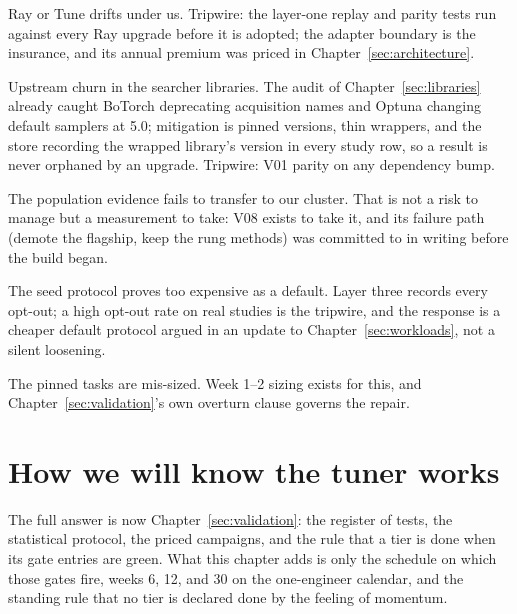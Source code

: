 Ray or Tune drifts under us. Tripwire: the layer-one replay and
parity tests run against every Ray upgrade before it is adopted;
the adapter boundary is the insurance, and its annual premium was
priced in Chapter~\ref{sec:architecture}.

Upstream churn in the searcher libraries. The audit of
Chapter~\ref{sec:libraries} already caught BoTorch deprecating
acquisition names and Optuna changing default samplers at 5.0;
mitigation is pinned versions, thin wrappers, and the store
recording the wrapped library's version in every study row, so a
result is never orphaned by an upgrade. Tripwire: V01 parity on any
dependency bump.

The population evidence fails to transfer to our cluster. That is
not a risk to manage but a measurement to take: V08 exists to take
it, and its failure path (demote the flagship, keep the rung
methods) was committed to in writing before the build began.

The seed protocol proves too expensive as a default. Layer three
records every opt-out; a high opt-out rate on real studies is the
tripwire, and the response is a cheaper default protocol argued in
an update to Chapter~\ref{sec:workloads}, not a silent loosening.

The pinned tasks are mis-sized. Week 1--2 sizing exists for this,
and Chapter~\ref{sec:validation}'s own overturn clause governs the
repair.

\section{How we will know the tuner works}

The full answer is now Chapter~\ref{sec:validation}: the register of
tests, the statistical protocol, the priced campaigns, and the rule
that a tier is done when its gate entries are green. What this
chapter adds is only the schedule on which those gates fire, weeks
6, 12, and 30 on the one-engineer calendar, and the standing rule
that no tier is declared done by the feeling of momentum.
